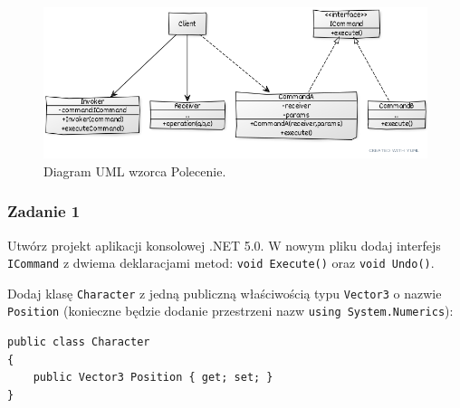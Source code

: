 

\begin{figure}[hbt!]
	\centering
	\includegraphics[width=0.9\linewidth]{images/CommandUml}
	\caption{Diagram UML wzorca Polecenie.}
	\label{lab4/fig/CommandUml}
\end{figure}
%

\subsubsection{Zadanie 1}
Utwórz projekt aplikacji konsolowej .NET 5.0. W nowym pliku dodaj interfejs \texttt{ICommand} z dwiema deklaracjami metod: \texttt{void Execute()} oraz \texttt{void Undo()}.

Dodaj klasę \texttt{Character} z jedną publiczną właściwością typu \texttt{Vector3} o nazwie \texttt{Position} (konieczne będzie dodanie przestrzeni nazw \texttt{using System.Numerics}):
\begin{lstlisting}
public class Character
{
	public Vector3 Position { get; set; }
}
\end{lstlisting}

